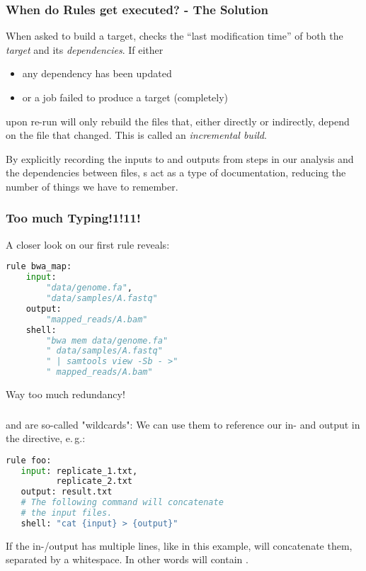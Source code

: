 \begin{frame}
  \frametitle{When do Rules get executed? - The Solution}
  When asked to build a target, \Snakemake{} checks the “last modification time” of both the \emph{target} and its \emph{dependencies}.
  If either
  \begin{itemize}
   \item any dependency has been updated
   \item or a job failed to produce a target (completely)
  \end{itemize}
  upon re-run \Snakemake{} will only rebuild the files that, either directly or indirectly, depend on the file that changed. This is called an \emph{incremental build}.
  \pause
  \begin{docs}
  	By explicitly recording the inputs to and outputs from steps in our analysis and the dependencies between files, s act as a type of documentation, reducing the number of things we have to remember.
  \end{docs}
\end{frame}

\begin{frame}[fragile]
  \frametitle{Too much Typing!1!11!}
  A closer look on our first rule reveals:
  \begin{lstlisting}[language=Python,style=Python]
rule bwa_map:
    input:
        "data/genome.fa",
        "data/samples/A.fastq"
    output:
        "mapped_reads/A.bam"
    shell:
        "bwa mem data/genome.fa"
        " data/samples/A.fastq"
        " | samtools view -Sb - >"
        " mapped_reads/A.bam"
    \end{lstlisting}
    \bcattention Way too much redundancy!
\end{frame}

\begin{frame}[fragile]
	\frametitle{}
	 and  are so-called "wildcards": We can use them 
	to reference our in- and output in the  directive, e.\,g.:
	\begin{lstlisting}[language=Python,style=Python]
rule foo:
   input: replicate_1.txt,
          replicate_2.txt
   output: result.txt
   # The following command will concatenate
   # the input files.
   shell: "cat {input} > {output}"
    \end{lstlisting}
    \begin{docs}
      If the in-/output has multiple lines, like in this example, \Snakemake{} will concatenate them, separated by a whitespace. In other words  will contain .
    \end{docs}
\end{frame}

